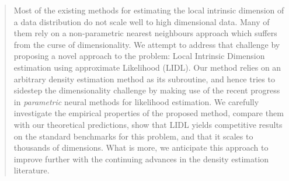\begin{abstract}
Most of the existing methods for
estimating the local intrinsic dimension of 
a data distribution 
do not scale well to high dimensional data.
Many of them rely 
on a non-parametric nearest neighbours approach
which suffers from the curse of dimensionality.
We attempt to address that challenge
by proposing a novel approach to the problem: Local Intrinsic Dimension estimation using approximate Likelihood 
(LIDL).
Our method relies on an arbitrary density estimation method as its subroutine, 
and hence tries to sidestep the dimensionality challenge by making use of the recent progress in \emph{parametric} neural methods for likelihood estimation.
We carefully investigate the empirical properties of the proposed method, 
compare them with our theoretical predictions,
show that LIDL yields competitive results on the standard benchmarks for this problem,
and that it scales to thousands of dimensions.
What is more, we anticipate this approach to improve further with the continuing advances in the density estimation literature. 



\end{abstract}